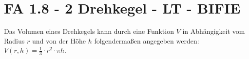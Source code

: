\section{FA 1.8 - 2 Drehkegel - LT - BIFIE}

\begin{beispiel}[FA 1.8]{1} %
Das Volumen eines Drehkegels kann durch eine Funktion $V$ in Abhängigkeit vom Radius $r$ und von der Höhe $h$ folgendermaßen angegeben werden: \mbox{$V(r,h)=\frac{1}{3}\cdot r^2\cdot \pi h$}.
\leer

\end{beispiel}